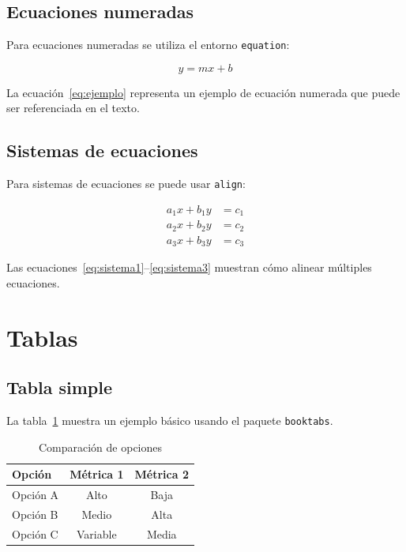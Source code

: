 \documentclass[a4paper,11pt]{report}
\begin{document}
\begin{appendices}
\subsection{Ecuaciones numeradas}

Para ecuaciones numeradas se utiliza el entorno \texttt{equation}:

\begin{equation}
  \label{eq:ejemplo}
  y = mx + b
\end{equation}

La ecuación~\eqref{eq:ejemplo} representa un ejemplo de ecuación numerada que puede ser referenciada en el texto.

\subsection{Sistemas de ecuaciones}

Para sistemas de ecuaciones se puede usar \texttt{align}:

\begin{align}
  a_1 x + b_1 y &= c_1 \label{eq:sistema1} \\
  a_2 x + b_2 y &= c_2 \label{eq:sistema2} \\
  a_3 x + b_3 y &= c_3 \label{eq:sistema3}
\end{align}

Las ecuaciones~\eqref{eq:sistema1}--\eqref{eq:sistema3} muestran cómo alinear múltiples ecuaciones.

\section{Tablas}

\subsection{Tabla simple}

La tabla~\ref{tab:simple} muestra un ejemplo básico usando el paquete \texttt{booktabs}.

\begin{table}[htbp]
  \centering
  \caption{Comparación de opciones}
  \label{tab:simple}
  \begin{tabular}{lcc}
    \toprule
    \textbf{Opción} & \textbf{Métrica 1} & \textbf{Métrica 2} \\
    \midrule
    Opción A & Alto & Baja \\
    Opción B & Medio & Alta \\
    Opción C & Variable & Media \\
    \bottomrule
  \end{tabular}
\end{table}


\end{appendices}
\end{document}
